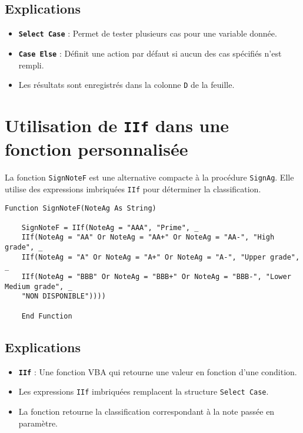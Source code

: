 \documentclass[a4paper,12pt]{report}
\begin{document}
\subsection*{Explications}

\begin{itemize}
	\item \textbf{\texttt{Select Case}} : Permet de tester plusieurs cas pour une variable donnée.
	\item \textbf{\texttt{Case Else}} : Définit une action par défaut si aucun des cas spécifiés n'est rempli.
	\item Les résultats sont enregistrés dans la colonne \texttt{D} de la feuille.
\end{itemize}

\section{Utilisation de \texttt{IIf} dans une fonction personnalisée}

La fonction \texttt{SignNoteF} est une alternative compacte à la procédure \texttt{SignAg}. Elle utilise des expressions imbriquées \texttt{IIf} pour déterminer la classification.

\begin{lstlisting}[language=vbscript, caption={Fonction \texttt{SignNoteF}}]
	Function SignNoteF(NoteAg As String)
	
	SignNoteF = IIf(NoteAg = "AAA", "Prime", _
	IIf(NoteAg = "AA" Or NoteAg = "AA+" Or NoteAg = "AA-", "High grade", _
	IIf(NoteAg = "A" Or NoteAg = "A+" Or NoteAg = "A-", "Upper grade", _
	IIf(NoteAg = "BBB" Or NoteAg = "BBB+" Or NoteAg = "BBB-", "Lower Medium grade", _
	"NON DISPONIBLE"))))
	
	End Function
\end{lstlisting}

\subsection*{Explications}

\begin{itemize}
	\item \textbf{\texttt{IIf}} : Une fonction VBA qui retourne une valeur en fonction d'une condition.
	\item Les expressions \texttt{IIf} imbriquées remplacent la structure \texttt{Select Case}.
	\item La fonction retourne la classification correspondant à la note passée en paramètre.
\end{itemize}
\end{document}
